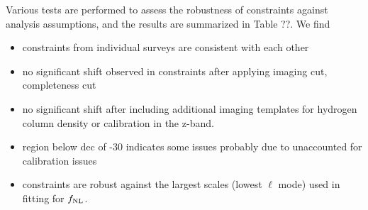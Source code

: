 Various tests are performed to assess the robustness of constraints against analysis assumptions, and the results are summarized in Table ??. We find
\begin{itemize}
\item constraints from individual surveys are consistent with each other
\item no significant shift observed in constraints after applying imaging cut, completeness cut
\item no significant shift after including additional imaging templates for hydrogen column density or calibration in the z-band.
\item region below dec of -30 indicates some issues probably due to unaccounted for calibration issues
\item constraints are robust against the largest scales (lowest $\ell$ mode) used in fitting for $f_{\rm NL}$. 
\end{itemize}
%    
